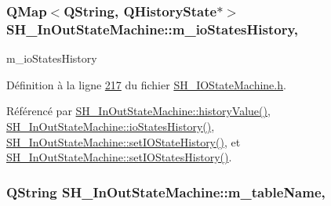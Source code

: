 \hypertarget{classSH__InOutStateMachine_aaca2ea542b3f5b4cd238396b07492455}{
\subsubsection[{m\-\_\-io\-States\-History}]{\setlength{\rightskip}{0pt plus 5cm}Q\-Map$<$Q\-String, Q\-History\-State$\ast$$>$ S\-H\-\_\-\-In\-Out\-State\-Machine\-::m\-\_\-io\-States\-History\hspace{0.3cm}{\ttfamily [protected]}, {\ttfamily [inherited]}}}\label{classSH__InOutStateMachine_aaca2ea542b3f5b4cd238396b07492455}


m\-\_\-io\-States\-History 



Définition à la ligne \hyperlink{SH__IOStateMachine_8h_source_l00217}{217} du fichier \hyperlink{SH__IOStateMachine_8h_source}{S\-H\-\_\-\-I\-O\-State\-Machine.\-h}.



Référencé par \hyperlink{classSH__InOutStateMachine_a84fb2b2c2105cae9c590c0d15960854a}{S\-H\-\_\-\-In\-Out\-State\-Machine\-::history\-Value()}, \hyperlink{classSH__InOutStateMachine_a4ec3ebb4c40ea57c63afdf5976e62a94}{S\-H\-\_\-\-In\-Out\-State\-Machine\-::io\-States\-History()}, \hyperlink{classSH__InOutStateMachine_a4b72e6da839782a211692a4d728c3925}{S\-H\-\_\-\-In\-Out\-State\-Machine\-::set\-I\-O\-State\-History()}, et \hyperlink{classSH__InOutStateMachine_ab35839e7880506286ebb5a11c2a924c2}{S\-H\-\_\-\-In\-Out\-State\-Machine\-::set\-I\-O\-States\-History()}.

\hypertarget{classSH__InOutStateMachine_acc0f5d5133af2dcca30939f53ec8837b}{
\subsubsection[{m\-\_\-table\-Name}]{\setlength{\rightskip}{0pt plus 5cm}Q\-String S\-H\-\_\-\-In\-Out\-State\-Machine\-::m\-\_\-table\-Name\hspace{0.3cm}{\ttfamily [protected]}, {\ttfamily [inherited]}}}\label{classSH__InOutStateMachine_acc0f5d5133af2dcca30939f53ec8837b}


